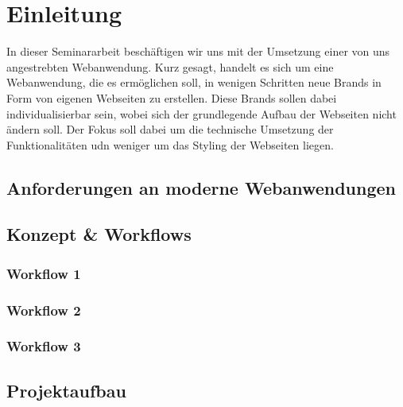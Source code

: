 \newpage

\section{Einleitung} \label{einleitung}
In dieser Seminararbeit beschäftigen wir uns mit der Umsetzung einer von uns angestrebten Webanwendung.
Kurz gesagt, handelt es sich um eine Webanwendung, die es ermöglichen soll, in wenigen Schritten neue Brands in Form von eigenen Webseiten zu erstellen.
Diese Brands sollen dabei individualisierbar sein, wobei sich der grundlegende Aufbau der Webseiten nicht ändern soll.
Der Fokus soll dabei um die technische Umsetzung der Funktionalitäten udn weniger um das Styling der Webseiten liegen.

\subsection{Anforderungen an moderne Webanwendungen} \label{anforderungen}


\subsection{Konzept \& Workflows} \label{konzeptWorkflows}

\subsubsection{Workflow 1} \label{workflow1}

\subsubsection{Workflow 2} \label{workflow2}

\subsubsection{Workflow 3} \label{workflow3}


\subsection{Projektaufbau} \label{projektaufbau}
